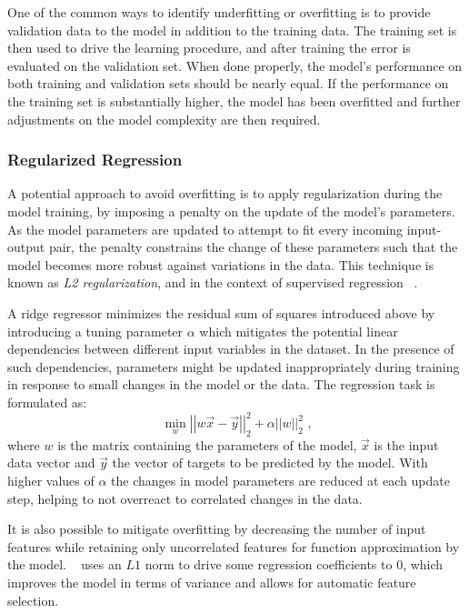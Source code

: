 One of the common ways to identify underfitting or overfitting is to provide validation data to the model in addition to the training data.
The training set is then used to drive the learning procedure, and after training the error is evaluated on the validation set.
When done properly, the model's performance on both training and validation sets should be nearly equal.
If the performance on the training set is substantially higher, the model has been overfitted and further adjustments on the model complexity are then required.

\subsubsection*{Regularized Regression}

A potential approach to avoid overfitting is to apply regularization during the model training, by imposing a penalty on the update of the model's parameters.
As the model parameters are updated to attempt to fit every incoming input-output pair, the penalty constrains the change of these parameters such that the model becomes more robust against variations in the data.
This technique is known as \textit{L2 regularization}, and in the context of supervised regression ~\cite{MIT:Rifkin:Regularized_Least_Squares}.

A ridge regressor minimizes the residual sum of squares introduced above by introducing a tuning parameter \(\alpha\) which mitigates the potential linear dependencies between different input variables in the dataset.
In the presence of such dependencies, parameters might be updated inappropriately during training in response to small changes in the model or the data.
The regression task is formulated as:
\begin{equation}
    \min _w \left|\left| w \vec{x} - \vec{y} \right|\right|_2^2 + \alpha \left|\left| w \right|\right|_2^2 \text{ ,}
    \label{equation:ridge_regression_regularization}
\end{equation}
where \(w\) is the matrix containing the parameters of the model, \(\vec{x}\) is the input data vector and \(\vec{y}\) the vector of targets to be predicted by the model.
With higher values of \(\alpha\) the changes in model parameters are reduced at each update step, helping to not overreact to correlated changes in the data.

It is also possible to mitigate overfitting by decreasing the number of input features while retaining only uncorrelated features for function approximation by the model.
~\cite{JRSS:Tibshirani:Regression_Shrinkage_Selection_Via_Lasso} uses an \(L1\) norm to drive some regression coefficients to \(0\), which improves the model in terms of variance and allows for automatic feature selection.

